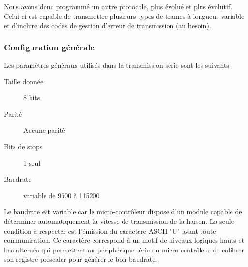 \documentclass[11pt, french]{article} %
\begin{document}
\medskip
Nous avons donc programmé un autre protocole, plus évolué et plus évolutif. Celui ci est capable de transmettre plusieurs types de trames à longueur variable et d'inclure des codes de gestion d'erreur de transmission (au besoin).

\subsubsection{Configuration générale}
\noindent
Les paramètres généraux utilisés dans la transmission série sont les suivants :
\begin{description}
	\item[Taille donnée] 8 bits
	\item[Parité] Aucune parité
	\item[Bits de stops] 1 seul
	\item[Baudrate] variable de 9600 à 115200
\end{description}

\medskip
Le baudrate est variable car le micro-contrôleur dispose d'un module capable de déterminer automatiquement la vitesse de transmission de la liaison. La seule condition à respecter est l'émission du caractère ASCII "U" avant toute communication. Ce caractère correspond à un motif de niveaux logiques hauts et bas alternés qui permettent au périphérique série du micro-contrôleur de calibrer son registre prescaler pour générer le bon baudrate.
\end{document}
